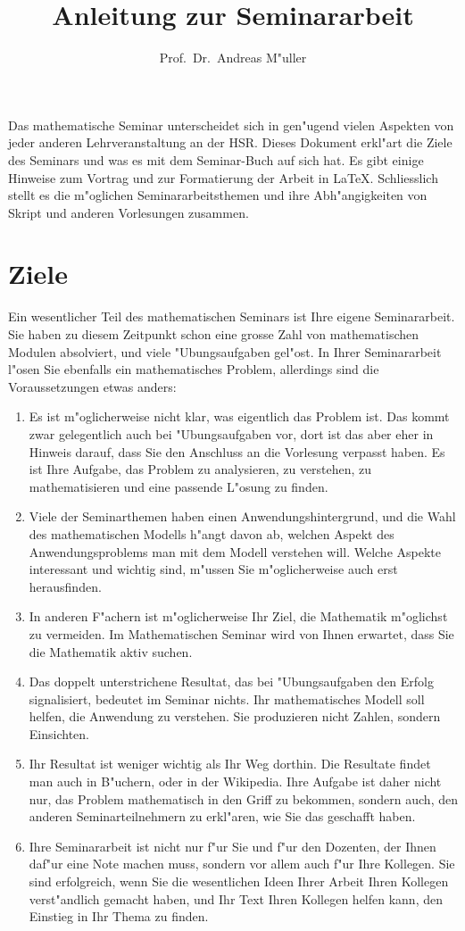 \documentclass[a4paper]{article}
\begin{document}
\title{Anleitung zur Seminararbeit}
\author{Prof.~Dr.~Andreas M"uller}
\date{}
\maketitle
Das mathematische Seminar unterscheidet sich in gen"ugend vielen Aspekten
von jeder anderen Lehrveranstaltung an der HSR.
Dieses Dokument erkl"art die Ziele des Seminars und was es mit dem
Seminar-Buch auf sich hat.
Es gibt einige Hinweise zum Vortrag und zur Formatierung der
Arbeit in \LaTeX.
Schliesslich stellt es die m"oglichen Seminararbeitsthemen
und ihre Abh"angigkeiten von Skript und anderen Vorlesungen
zusammen.
\section{Ziele}
Ein wesentlicher Teil des mathematischen Seminars ist Ihre eigene 
Seminararbeit.
Sie haben zu diesem Zeitpunkt schon eine grosse Zahl von mathematischen
Modulen absolviert, und viele "Ubungsaufgaben gel"ost.
In Ihrer Seminararbeit l"osen Sie ebenfalls ein mathematisches
Problem, allerdings sind die Voraussetzungen etwas anders:
\begin{enumerate}
\item
Es ist m"oglicherweise nicht klar, was eigentlich das Problem ist. 
Das kommt zwar gelegentlich auch bei "Ubungsaufgaben vor, dort ist
das aber eher in Hinweis darauf, dass Sie den Anschluss an die Vorlesung
verpasst haben.
Es ist Ihre Aufgabe, das Problem zu analysieren, zu verstehen, zu
mathematisieren und eine passende L"osung zu finden.
\item
Viele der Seminarthemen haben einen Anwendungshintergrund, und die
Wahl des mathematischen Modells h"angt davon ab, welchen Aspekt des
Anwendungsproblems man mit dem Modell verstehen will.
Welche Aspekte interessant und wichtig sind, m"ussen Sie m"oglicherweise
auch erst herausfinden.
\item
In anderen F"achern ist m"oglicherweise Ihr Ziel, die Mathematik
m"oglichst zu vermeiden.
Im Mathematischen Seminar wird von Ihnen erwartet, dass Sie die Mathematik
aktiv suchen.
\item
Das doppelt unterstrichene Resultat, das bei "Ubungsaufgaben 
den Erfolg signalisiert, bedeutet im Seminar nichts. 
Ihr mathematisches Modell soll helfen, die Anwendung zu verstehen.
Sie produzieren nicht Zahlen, sondern Einsichten.
\item
Ihr Resultat ist weniger wichtig als Ihr Weg dorthin. 
Die Resultate findet man auch in B"uchern, oder in der Wikipedia.
Ihre Aufgabe ist daher nicht nur, das Problem mathematisch in den
Griff zu bekommen, sondern auch, den anderen Seminarteilnehmern zu
erkl"aren, wie Sie das geschafft haben.
\item
Ihre Seminararbeit ist nicht nur f"ur Sie und f"ur den Dozenten,
der Ihnen daf"ur eine Note machen muss, sondern vor allem auch f"ur
Ihre Kollegen. 
Sie sind erfolgreich, wenn Sie die wesentlichen Ideen Ihrer Arbeit
Ihren Kollegen verst"andlich gemacht haben, und Ihr Text Ihren
Kollegen helfen kann, den Einstieg in Ihr Thema zu finden.
\end{enumerate}
\end{document}
